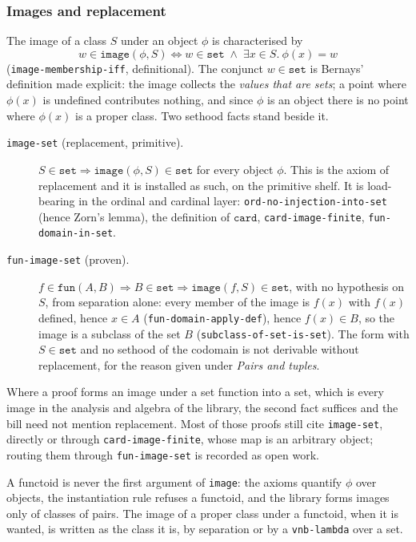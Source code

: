 \subsubsection{Images and replacement}

The image of a class $S$ under an object $\phi$ is characterised by
\[
  w \in \mathtt{image}(\phi, S) \iff
  w \in \mathtt{set} \;\wedge\; \exists x \in S.\ \phi(x) = w
\]
(\texttt{image-membership-iff}, definitional).  The conjunct
$w \in \mathtt{set}$ is Bernays' definition made explicit: the image
collects the \emph{values that are sets}; a point where $\phi(x)$ is
undefined contributes nothing, and since $\phi$ is an object there is no
point where $\phi(x)$ is a proper class.  Two sethood facts stand beside
it.

\begin{description}
\item[\texttt{image-set} (replacement, primitive).]
  $S \in \mathtt{set} \Longrightarrow \mathtt{image}(\phi, S) \in
  \mathtt{set}$ for every object $\phi$.  This is the axiom of replacement
  and it is installed as such, on the primitive shelf.  It is load-bearing in the ordinal and cardinal
  layer: \texttt{ord-no-injection-into-set} (hence Zorn's lemma), the
  definition of $\mathtt{card}$, \texttt{card-image-finite},
  \texttt{fun-domain-in-set}.
\item[\texttt{fun-image-set} (proven).]
  $f \in \mathtt{fun}(A, B) \Longrightarrow B \in \mathtt{set}
  \Longrightarrow \mathtt{image}(f, S) \in \mathtt{set}$, with no
  hypothesis on $S$, from separation alone: every member of the image is
  $f(x)$ with $f(x)$ defined, hence $x \in A$ (\texttt{fun-domain-apply-def}),
  hence $f(x) \in B$, so the image is a subclass of the set $B$
  (\texttt{subclass-of-set-is-set}).  The form with $S \in \mathtt{set}$
  and no sethood of the codomain is not derivable without replacement, for
  the reason given under \emph{Pairs and tuples}.
\end{description}

Where a proof forms an image under a set function into a set, which is
every image in the analysis and algebra of the library, the second fact
suffices and the bill need not mention replacement.  Most of those proofs
still cite \texttt{image-set}, directly or through \texttt{card-image-finite},
whose map is an arbitrary object; routing them through
\texttt{fun-image-set} is recorded as open work.

A functoid is never the first argument of \texttt{image}: the axioms
quantify $\phi$ over objects, the instantiation rule refuses a functoid, and
the library forms images only of classes of pairs.  The image of a proper
class under a functoid, when it is wanted, is written as the class it is, by
separation or by a \texttt{vnb-lambda} over a set.

